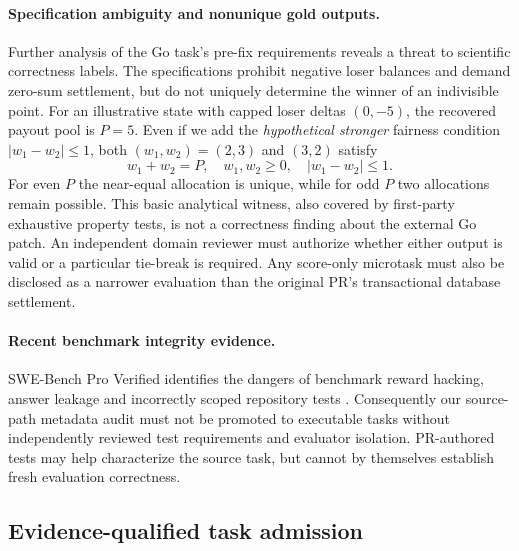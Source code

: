 \documentclass[pdflatex,sn-basic]{sn-jnl}
\begin{document}
\paragraph{Specification ambiguity and nonunique gold outputs.}
Further analysis of the Go task's pre-fix
requirements reveals a threat to scientific
correctness labels. The specifications prohibit
negative loser balances and demand zero-sum
settlement, but do not uniquely determine the
winner of an indivisible point. For an illustrative
state with capped loser deltas $(0,-5)$,
the recovered payout pool is $P=5$.
Even if we add the \emph{hypothetical stronger}
fairness condition $|w_1-w_2|\leq 1$, both
$(w_1,w_2)=(2,3)$ and $(3,2)$ satisfy
\begin{equation}
w_1+w_2=P,\quad
w_1,w_2\geq0,\quad |w_1-w_2|\leq1.
\label{eq:oracle-ambiguity}
\end{equation}
For even $P$ the near-equal allocation is
unique, while for odd $P$ two allocations
remain possible. This basic analytical witness,
also covered by first-party exhaustive property
tests, is not a correctness finding about
the external Go patch. An independent domain
reviewer must authorize whether either output
is valid or a particular tie-break is required.
Any score-only microtask must also be disclosed
as a narrower evaluation than the original
PR's transactional database settlement.

\paragraph{Recent benchmark integrity evidence.}
SWE-Bench Pro Verified identifies the dangers
of benchmark reward hacking, answer leakage
and incorrectly scoped repository tests
\cite{zheng2026sweproverified}.
Consequently our source-path metadata audit
must not be promoted to executable tasks
without independently reviewed test
requirements and evaluator isolation.
PR-authored tests may help characterize
the source task, but cannot by themselves
establish fresh evaluation correctness.

\subsection{Evidence-qualified task admission}\label{sec:admission}
\end{document}
